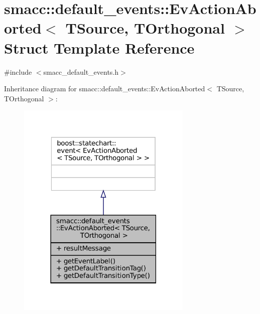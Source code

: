 \hypertarget{structsmacc_1_1default__events_1_1EvActionAborted}{}\section{smacc\+:\+:default\+\_\+events\+:\+:Ev\+Action\+Aborted$<$ T\+Source, T\+Orthogonal $>$ Struct Template Reference}
\label{structsmacc_1_1default__events_1_1EvActionAborted}


{\ttfamily \#include $<$smacc\+\_\+default\+\_\+events.\+h$>$}



Inheritance diagram for smacc\+:\+:default\+\_\+events\+:\+:Ev\+Action\+Aborted$<$ T\+Source, T\+Orthogonal $>$\+:
\nopagebreak
\begin{figure}[H]
\begin{center}
\leavevmode
\includegraphics[width=237pt]{structsmacc_1_1default__events_1_1EvActionAborted__inherit__graph}
\end{center}
\end{figure}


